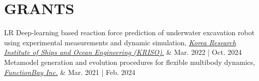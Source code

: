 \documentclass[a4paper,10pt]{extarticle}
\begin{document}
\section*{GRANTS}
\noindent
{}
\vspace*{-.5cm}
\begin{longtable}{LR}
	Deep-learning based reaction force prediction of underwater excavation robot using experimental measurements and dynamic simulation, \href{https://www.kriso.re.kr/eng/}{\textit{Korea Research Institute of Ships and Ocean Engineering (KRISO)}.} & {Mar. 2022 | Oct. 2024} \\

	Metamodel generation and evolution procedures for flexible multibody dynamics, \href{https://functionbay.com/en}{\textit{FunctionBay Inc.}}                                                                                                         & {Mar. 2021 | Feb. 2024} \\





\end{longtable}
\end{document}
